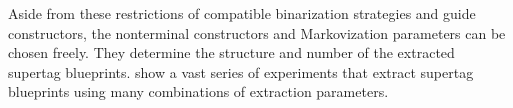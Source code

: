 \documentclass[../../document.tex]{subfiles}
\begin{document}
    Aside from these restrictions of compatible binarization strategies and guide constructors, the nonterminal constructors and Markovization parameters can be chosen freely.
    They determine the structure and number of the extracted supertag blueprints.
     show a vast series of experiments that extract supertag blueprints using many combinations of extraction parameters.
\end{document}

